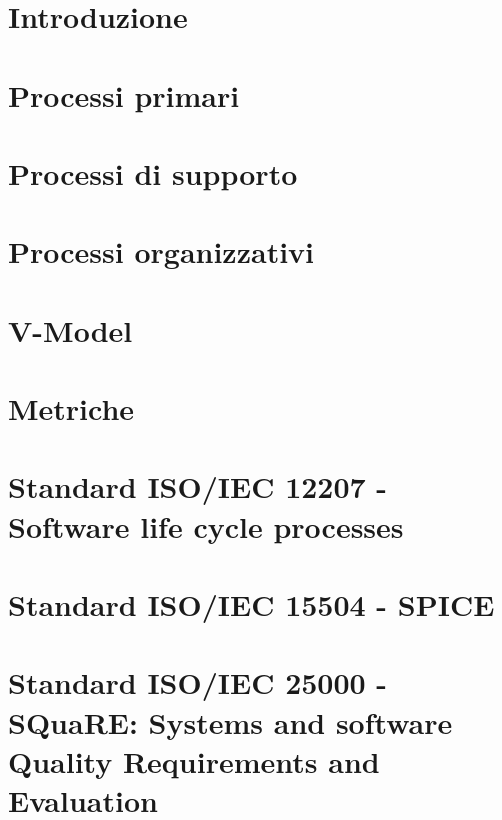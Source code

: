 \documentclass{classes/base}
\begin{document}
	\newpage
	
	\newpage
	\tableofcontents
	\newpage
	\listoftables

	\newpage
	\section{Introduzione}
	
	
	\newpage
	\section{Processi primari}
	
	
	\newpage
	\section{Processi di supporto}
	
	
	\newpage
	\section{Processi organizzativi}
	

	\newpage
	\section{V-Model}
	
	
	\newpage
	\section{Metriche}
	
	
	\newpage
	\section{Standard ISO/IEC 12207 - Software life cycle processes}
	
	
	\newpage
	\section{Standard ISO/IEC 15504 - SPICE}
	
	
	\newpage
	\section{Standard ISO/IEC 25000 - SQuaRE: Systems and software Quality
		Requirements and Evaluation} %
	
	
\end{document}
